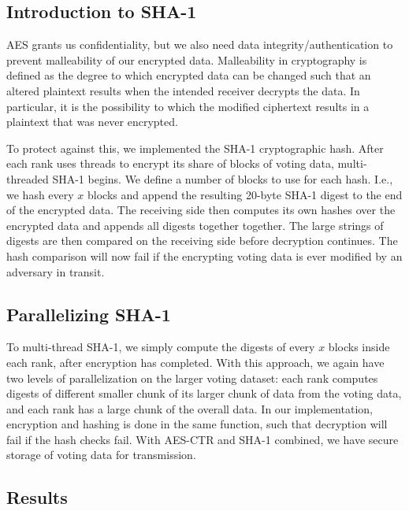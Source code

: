 \documentclass[final,5p,times,twocolumn,authoryear, 10pt]{elsarticle}
\begin{document}
\subsection{Introduction to SHA-1}

AES grants us confidentiality, but we also need data integrity/authentication
to prevent malleability of our encrypted data. Malleability in cryptography is
defined as the degree to which encrypted data can be changed such that an
altered plaintext results when the intended receiver decrypts the data. In
particular, it is the possibility to which the modified ciphertext results in a
plaintext that was never encrypted.

To protect against this, we implemented the SHA-1 cryptographic hash. After
each rank uses threads to encrypt its share of blocks of voting data,
multi-threaded SHA-1 begins. We define a number of blocks to use for each hash.
I.e., we hash every $x$ blocks and append the resulting 20-byte SHA-1 digest to
the end of the encrypted data. The receiving side then computes its own hashes
over the encrypted data and appends all digests together together. The large
strings of digests are then compared on the receiving side before decryption
continues. The hash comparison will now fail if the encrypting voting data is
ever modified by an adversary in transit. 

\subsection{Parallelizing SHA-1}

To multi-thread SHA-1, we simply compute the digests of every $x$ blocks inside
each rank, after encryption has completed. With this approach, we again have two
levels of parallelization on the larger voting dataset: each rank computes
digests of different smaller chunk of its larger chunk of data from the voting
data, and each rank has a large chunk of the overall data. In our
implementation, encryption and hashing is done in the same function, such that
decryption will fail if the hash checks fail. With AES-CTR and SHA-1 combined,
we have secure storage of voting data for transmission.

\subsection{Results}
\end{document}
